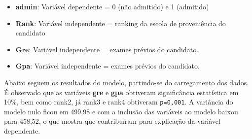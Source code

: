 \documentclass[12pt,brazil,oneside]{book}
\newenvironment{Shaded}{\begin{snugshade}}{\end{snugshade}}
\newcommand{\CommentTok}[1]{\textcolor[rgb]{0.56,0.35,0.01}{\textit{#1}}}
\newcommand{\DataTypeTok}[1]{\textcolor[rgb]{0.13,0.29,0.53}{#1}}
\newcommand{\KeywordTok}[1]{\textcolor[rgb]{0.13,0.29,0.53}{\textbf{#1}}}
\newcommand{\NormalTok}[1]{#1}
\newcommand{\OperatorTok}[1]{\textcolor[rgb]{0.81,0.36,0.00}{\textbf{#1}}}
\newcommand{\StringTok}[1]{\textcolor[rgb]{0.31,0.60,0.02}{#1}}
\providecommand{\tightlist}{%
  \setlength{\itemsep}{0pt}\setlength{\parskip}{0pt}}
\begin{document}
\begin{itemize}
\tightlist
\item
  \textbf{admin}: Variável dependente = 0 (não admitido) e 1 (admitido)
\item
  \textbf{Rank}: Variável independente = ranking da escola de
  proveniência do candidato
\item
  \textbf{Gre}: Variável independente = exames prévios do candidato.
\item
  \textbf{Gpa}: Variável independente = exames prévios do candidato.
\end{itemize}

Abaixo seguem os resultados do modelo, partindo-se do carregamento dos
dados. É observado que as variáveis \textbf{gre} e \textbf{gpa}
obtiveram significância estatística em 10\%, bem como rank2, já rank3 e
rank4 obtiveram \texttt{p=0,001}. A variância do modelo nulo ficou em
499,98 e com a inclusão das variáveis ao modelo baixou para 458,52, o
que mostra que contribuíram para explicação da variável dependente.

\begin{Shaded}
\end{Shaded}
\end{document}
